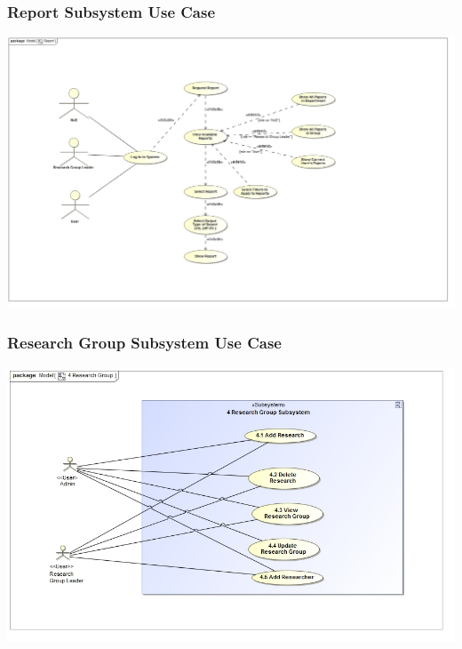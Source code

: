 \documentclass{article}
\begin{document}
			\subsubsection{Report Subsystem Use Case}
				\includegraphics[width=\textwidth]{ReportUseCase}
			\subsubsection{Research Group Subsystem Use Case}
				\includegraphics[width=\textwidth]{ResearchGroup}
\end{document}
